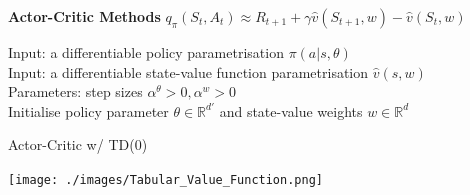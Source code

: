 \documentclass[10pt,landscape]{article}
\begin{document}
\begin{multicols}{3}
\textbf{Actor-Critic Methods} $q_\pi(S_t, A_t) \approx R_{t+1} + \gamma \hat{v}(S_{t+1}, w) - \hat{v}(S_{t}, w)$

\begin{algorithm}[H]
Input: a differentiable policy parametrisation $\pi(a|s,\theta)$ \\
Input: a differentiable state-value function parametrisation $\hat{v}(s,w)$ \\
Parameters: step sizes $\alpha^\theta > 0, \alpha^w > 0$ \\
Initialise policy parameter $\theta \in \mathbb{R}^{d'}$ and state-value weights $w \in \mathbb{R}^d$

\caption{Actor-Critic w/ TD(0)}
\end{algorithm}




\begin{center}
\texttt{[image: ./images/Tabular\_Value\_Function.png]}
\end{center}
\end{multicols}
\end{document}
